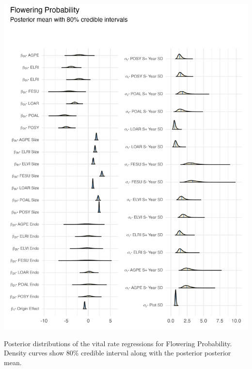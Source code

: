 \documentclass[lineno, sn-basic]{sn-jnl}%
\providecommand{\DIFaddbegin}{} %
\providecommand{\DIFaddend}{} %
\providecommand{\DIFdelbegin}{} %
\providecommand{\DIFdelend}{} %
\providecommand{\DIFaddbeginFL}{} %
\providecommand{\DIFaddendFL}{} %
\providecommand{\DIFdelbeginFL}{} %
\providecommand{\DIFdelendFL}{} %
\newcommand{\DIFscaledelfig}{0.5}
\newlength{\DIFdelgraphicswidth} %
\newlength{\DIFdelgraphicsheight} %
\newcommand{\DIFaddincludegraphics}[2][]{{\color{blue}\fbox{\DIFOincludegraphics[#1]{#2}}}} %
\newcommand{\DIFdelincludegraphics}[2][]{%
\sbox{\DIFdelgraphicsbox}{\DIFOincludegraphics[#1]{#2}}%
\settoboxwidth{\DIFdelgraphicswidth}{\DIFdelgraphicsbox} %
\settoboxtotalheight{\DIFdelgraphicsheight}{\DIFdelgraphicsbox} %
\scalebox{\DIFscaledelfig}{%
\parbox[b]{\DIFdelgraphicswidth}{\usebox{\DIFdelgraphicsbox}\\[-\baselineskip] \rule{\DIFdelgraphicswidth}{0em}}\llap{\resizebox{\DIFdelgraphicswidth}{\DIFdelgraphicsheight}{%
\setlength{\unitlength}{\DIFdelgraphicswidth}%
\begin{picture}(1,1)%
\thicklines\linethickness{2pt} %
{\color[rgb]{1,0,0}\put(0,0){\framebox(1,1){}}}%
{\color[rgb]{1,0,0}\put(0,0){\line( 1,1){1}}}%
{\color[rgb]{1,0,0}\put(0,1){\line(1,-1){1}}}%
\end{picture}%
}\hspace*{3pt}}} %
} %
\DeclareRobustCommand{\DIFaddbegin}{\DIFOaddbegin \let\includegraphics\DIFaddincludegraphics} %
\DeclareRobustCommand{\DIFaddend}{\DIFOaddend \let\includegraphics\DIFOincludegraphics} %
\DeclareRobustCommand{\DIFdelbegin}{\DIFOdelbegin \let\includegraphics\DIFdelincludegraphics} %
\DeclareRobustCommand{\DIFdelend}{\DIFOaddend \let\includegraphics\DIFOincludegraphics} %
\DeclareRobustCommand{\DIFaddbeginFL}{\DIFOaddbeginFL \let\includegraphics\DIFaddincludegraphics} %
\DeclareRobustCommand{\DIFaddendFL}{\DIFOaddendFL \let\includegraphics\DIFOincludegraphics} %
\DeclareRobustCommand{\DIFdelbeginFL}{\DIFOdelbeginFL \let\includegraphics\DIFdelincludegraphics} %
\DeclareRobustCommand{\DIFdelendFL}{\DIFOaddendFL \let\includegraphics\DIFOincludegraphics} %
\begin{document}
\DIFdelbegin %
\DIFdelendFL \DIFaddbeginFL \begin{myfigure}[H]
	\DIFaddendFL \centering
	\includegraphics[width = \linewidth]{flw_posteriors_plot.png}
	\DIFdelbeginFL %
\DIFdelendFL \DIFaddbeginFL \caption[Posterior distributions of the vital rate regressions for Flowering Probability]{\DIFaddendFL Posterior distributions of the vital rate regressions for Flowering Probability. Density curves show $80\%$ credible interval along with the posterior posterior mean.}
\DIFdelbeginFL %
\DIFdelend \DIFaddbegin \end{myfigure}
\DIFaddend 
\end{document}
